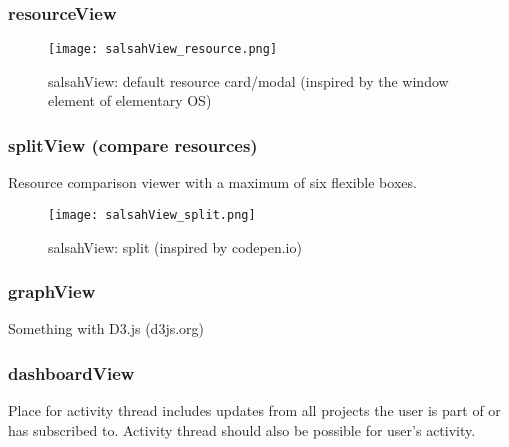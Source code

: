 \subsubsection{resourceView}
\begin{figure}[!h]
    \centering
    \texttt{[image: salsahView\_resource.png]}
    \caption{salsahView: default resource card/modal (inspired by the window element of elementary OS)}
\end{figure}



\subsubsection{splitView (compare resources)}
Resource comparison viewer with a maximum of six flexible boxes.

\begin{figure}[!h]
    \centering
    \texttt{[image: salsahView\_split.png]}
    \caption{salsahView: split (inspired by codepen.io)}
\end{figure}

\subsubsection{graphView}
Something with D3.js (d3js.org)

\subsubsection{dashboardView}
Place for activity thread includes updates from all projects the user is part of or has subscribed to. Activity thread should also be possible for user's activity.
